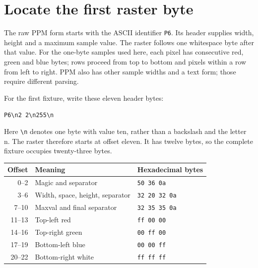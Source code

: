 \section{Locate the first raster byte}
The raw PPM form starts with the ASCII identifier \texttt{P6}. Its header supplies
width, height and a maximum sample value. The raster follows one whitespace byte after
that value. For the one-byte samples used here, each pixel has consecutive red, green
and blue bytes; rows proceed from top to bottom and pixels within a row from left to
right. PPM also has other sample widths and a text form; those require different parsing.

For the first fixture, write these eleven header bytes:
\begin{center}
  \texttt{P6\textbackslash n2 2\textbackslash n255\textbackslash n}
\end{center}
Here \texttt{\textbackslash n} denotes one byte with value ten, rather than a backslash
and the letter n. The raster therefore starts at offset eleven. It has twelve bytes,
so the complete fixture occupies twenty-three bytes.
\begin{center}
  \begin{tabular}{rll}
    Offset & Meaning                         & Hexadecimal bytes    \\
    \hline
    0--2   & Magic and separator             & \texttt{50 36 0a}    \\
    3--6   & Width, space, height, separator & \texttt{32 20 32 0a} \\
    7--10  & Maxval and final separator      & \texttt{32 35 35 0a} \\
    11--13 & Top-left red                    & \texttt{ff 00 00}    \\
    14--16 & Top-right green                 & \texttt{00 ff 00}    \\
    17--19 & Bottom-left blue                & \texttt{00 00 ff}    \\
    20--22 & Bottom-right white              & \texttt{ff ff ff}    \\
  \end{tabular}
\end{center}

